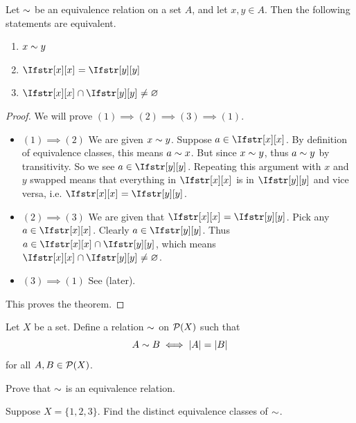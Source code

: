 \begin{theorem}\label{theorem:equivalence-class-equivalence}
    Let $\sim$ be an equivalence relation on a set $A$, and let $x, y \in A$. Then the following statements are equivalent.
    \begin{enumerate}
        \item $x \sim y$
        \item $\EqClass{x} = \EqClass{y}$
        \item $\EqClass{x} \cap \EqClass{y} \neq \emptyset$
    \end{enumerate}
\end{theorem}
\begin{proof}
    We will prove $(1) \implies (2) \implies (3) \implies (1)$.
    \begin{itemize}
        \item $\boxed{(1) \implies (2)}$ We are given $x \sim y$. Suppose $a \in \EqClass{x}$. By definition of equivalence classes, this means $a \sim x$. But since $x \sim y$, thus $a \sim y$ by transitivity. So we see $a \in \EqClass{y}$. Repeating this argument with $x$ and $y$ swapped means that everything in $\EqClass{x}$ is in $\EqClass{y}$ and vice versa, i.e. $\EqClass{x} = \EqClass{y}$.
        
        \item $\boxed{(2) \implies (3)}$ We are given that $\EqClass{x} = \EqClass{y}$. Pick any $a \in \EqClass{x}$. Clearly $a \in \EqClass{y}$. Thus $a \in \EqClass{x} \cap \EqClass{y}$, which means $\EqClass{x} \cap \EqClass{y} \neq \emptyset$.

        \item $\boxed{(3) \implies (1)}$ See  (later).
    \end{itemize}
    This proves the theorem.
\end{proof}

\begin{exercise}
    Let $X$ be a set. Define a relation $\sim$ on ${\mathcal{P}(X)}$ such that
    \[
        A \mathrel{\sim} B \iff |A| = |B|
    \]
    for all $A, B \in {\mathcal{P}(X)}$.
    \begin{partquestions}{\alph*}
        \item Prove that $\sim$ is an equivalence relation.
        \item Suppose $X = \{1, 2, 3\}$. Find the distinct equivalence classes of $\sim$.
    \end{partquestions}
\end{exercise}

